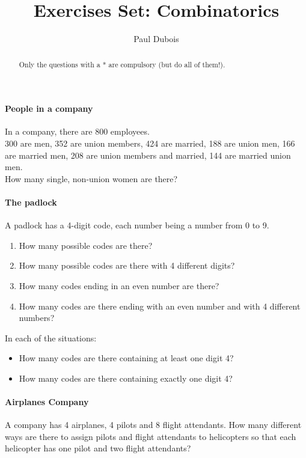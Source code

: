 \documentclass[]{article}
\title{Exercises Set: Combinatorics}
\author{Paul Dubois}
\date{}
\begin{document}
	
	\maketitle
	
	\begin{abstract}
		Only the questions with a * are compulsory (but do all of them!).
	\end{abstract}
	
	\paragraph{People in a company}
	In a company, there are 800 employees.\\
	300 are men, 352 are union members, 424 are married, 188 are union men, 166 are married men, 208 are union members and married, 144 are married union men.\\
	How many single, non-union women are there?
	
	\paragraph{The padlock}
	A padlock has a 4-digit code, each number being a number from 0 to 9.
	\begin{enumerate}
		\item How many possible codes are there?
		\item How many possible codes are there with 4 different digits?
		\item How many codes ending in an even number are there?
		\item How many codes are there ending with an even number and with 4 different numbers?
	\end{enumerate}
	In each of the situations:
	\begin{itemize}
		\item How many codes are there containing at least one digit 4?
		\item How many codes are there containing exactly one digit 4?
	\end{itemize}
	
	\paragraph{Airplanes Company}
	A company has 4 airplanes, 4 pilots and 8 flight attendants.
	How many different ways are there to assign pilots and flight attendants to helicopters so that each helicopter has one pilot and two flight attendants?
	
\end{document}
